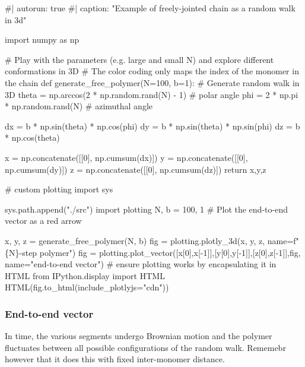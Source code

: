\documentclass[
  letterpaper,
  enabledeprecatedfontcommands]{report}
\newenvironment{Shaded}{\begin{snugshade}}{\end{snugshade}}
\newcommand{\NormalTok}[1]{\textcolor[rgb]{0.00,0.23,0.31}{#1}}
\begin{document}
\begin{Shaded}
\begin{Highlighting}[]
\NormalTok{\#| autorun: true}
\NormalTok{\#| caption: "Example of freely{-}jointed chain as a random walk in 3d"}

\NormalTok{import numpy as np}

\NormalTok{\# Play with the parameters (e.g. large and small N) and explore different conformations in 3D}
\NormalTok{\# The color coding only maps the index of the monomer in the chain}
\NormalTok{def generate\_free\_polymer(N=100, b=1):}
\NormalTok{    \# Generate random walk in 3D}
\NormalTok{    theta = np.arccos(2 * np.random.rand(N) {-} 1)  \# polar angle}
\NormalTok{    phi = 2 * np.pi * np.random.rand(N)           \# azimuthal angle}

\NormalTok{    dx = b * np.sin(theta) * np.cos(phi)}
\NormalTok{    dy = b * np.sin(theta) * np.sin(phi)}
\NormalTok{    dz = b * np.cos(theta)}

\NormalTok{    x = np.concatenate([[0], np.cumsum(dx)])}
\NormalTok{    y = np.concatenate([[0], np.cumsum(dy)])}
\NormalTok{    z = np.concatenate([[0], np.cumsum(dz)])}
\NormalTok{    return x,y,z}

\NormalTok{\# custom plotting}
\NormalTok{import sys}

\NormalTok{sys.path.append("./src")}
\NormalTok{import plotting}
\NormalTok{N, b = 100, 1}
\NormalTok{\# Plot the end{-}to{-}end vector as a red arrow}

\NormalTok{x, y, z = generate\_free\_polymer(N, b)}
\NormalTok{fig = plotting.plotly\_3d(x, y, z, name=f"\{N\}{-}step polymer")}
\NormalTok{fig = plotting.plot\_vector([x[0],x[{-}1]],[y[0],y[{-}1]],[z[0],z[{-}1]],fig, name="end{-}to{-}end vector")}
\NormalTok{\# ensure plotting works by encapsulating it in HTML}
\NormalTok{from IPython.display import HTML}
\NormalTok{HTML(fig.to\_html(include\_plotlyjs="cdn"))}
\end{Highlighting}
\end{Shaded}

\subsubsection*{End-to-end vector}\label{end-to-end-vector}

In time, the various segments undergo Brownian motion and the polymer
fluctuates between all possible configurations of the random walk.
Rememebr however that it does this with fixed inter-monomer distance.
\end{document}
